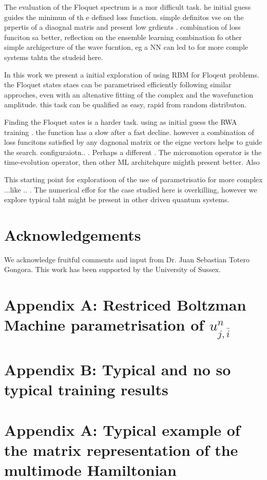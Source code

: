\documentclass[pra,twocolumn,showkeys,preprintnumbers, amsmath,amssymb, aps,A4paper]{revtex4-1}
\begin{document}
The evaluation of the Floquet spectrum is a mor difficult task. he initial guess guides the minimun of th e defined loss function. simple definitos vse on the prpertis of a diaognal matris and present low grdients .  combination of loss funciton sa better, reflection on the ensemble learning combination fo other simple archigecture of the wave fucntion, eg a NN can led to for more comple systems tahtn the studeid here. 

In this work we present a initial exploration of using RBM for Floqeut problems. the Floquet states staes can be parametrised efficiently following similar approches, even with an altenative fitting of the complex and the wavefunction amplitude. this task can be qualified as easy, rapid from random distributon. 

Finding the Floquet sates is a harder task. using as initial guess the RWA training . the function has a slow after a fast decline. however a combination of loss funcitons satisfied by any dagnonal matrix  or the eigne vectors helps to guide the search. configuraiotn.. . Perhaps a different . The micromotion operator is the time-evolution operator, then other ML architehqure mighth present better. Also

This starting point for exploratioon of the use of parametrisatio for more complex ...like .. .  The numerical effor for the case studied here is overkilling, however we explore typical taht might be present in other driven quantum systems. 






\section*{Acknowledgements}
We acknowledge fruitful comments and input from Dr. Juan Sebastian Totero Gongora. This work has been supported by the University of Sussex.

\section*{Appendix A: Restriced Boltzman Machine parametrisation of $u^n_{j,\bar{i}}$}
\section*{Appendix B: Typical and no so typical training results}
\section*{Appendix A: Typical example of the matrix representation of the multimode Hamiltonian}
\end{document}
